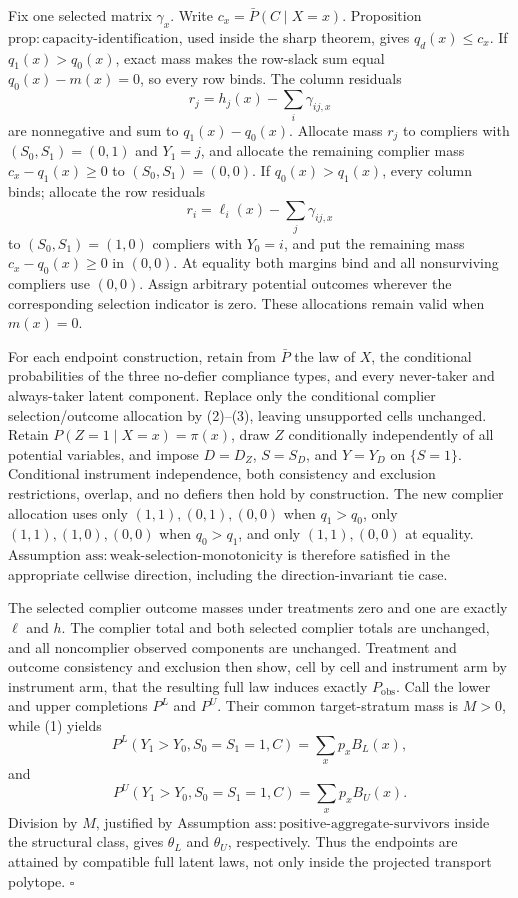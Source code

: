 Fix one selected matrix \(\gamma_x\).  Write
\(c_x=\bar P(C\mid X=x)\).  Proposition
\(\mathrm{prop{:}capacity\text{-}identification}\), used inside the sharp
theorem, gives \(q_d(x)\le c_x\).  If \(q_1(x)>q_0(x)\), exact mass makes
the row-slack sum equal \(q_0(x)-m(x)=0\), so every row binds.  The column
residuals
\[
r_j=h_j(x)-\sum_i\gamma_{ij,x}
\tag{2}
\]
are nonnegative and sum to \(q_1(x)-q_0(x)\).  Allocate mass \(r_j\) to
compliers with \((S_0,S_1)=(0,1)\) and \(Y_1=j\), and allocate the
remaining complier mass \(c_x-q_1(x)\ge0\) to \((S_0,S_1)=(0,0)\).  If
\(q_0(x)>q_1(x)\), every column binds; allocate the row residuals
\[
r_i=\ell_i(x)-\sum_j\gamma_{ij,x}
\tag{3}
\]
to \((S_0,S_1)=(1,0)\) compliers with \(Y_0=i\), and put the remaining
mass \(c_x-q_0(x)\ge0\) in \((0,0)\).  At equality both margins bind and
all nonsurviving compliers use \((0,0)\).  Assign arbitrary potential
outcomes wherever the corresponding selection indicator is zero.  These
allocations remain valid when \(m(x)=0\).

For each endpoint construction, retain from \(\bar P\) the law of \(X\),
the conditional probabilities of the three no-defier compliance types,
and every never-taker and always-taker latent component.  Replace only the
conditional complier selection/outcome allocation by (2)--(3), leaving
unsupported cells unchanged.  Retain
\(P(Z=1\mid X=x)=\pi(x)\), draw \(Z\) conditionally independently of all
potential variables, and impose \(D=D_Z\), \(S=S_D\), and \(Y=Y_D\) on
\(\{S=1\}\).  Conditional instrument independence, both consistency and
exclusion restrictions, overlap, and no defiers then hold by construction.
The new complier allocation uses only \((1,1),(0,1),(0,0)\) when
\(q_1>q_0\), only \((1,1),(1,0),(0,0)\) when \(q_0>q_1\), and only
\((1,1),(0,0)\) at equality.  Assumption
\(\mathrm{ass{:}weak\text{-}selection\text{-}monotonicity}\) is therefore
satisfied in the appropriate cellwise direction, including the
direction-invariant tie case.

The selected complier outcome masses under treatments zero and one are
exactly \(\ell\) and \(h\).  The complier total and both selected
complier totals are unchanged, and all noncomplier observed components
are unchanged.  Treatment and outcome consistency and exclusion then
show, cell by cell and instrument arm by instrument arm, that the
resulting full law induces exactly \(P_{\mathrm{obs}}\).  Call the lower
and upper completions \(P^L\) and \(P^U\).  Their common target-stratum
mass is \(M>0\), while (1) yields
\[
P^L(Y_1>Y_0,S_0=S_1=1,C)=\sum_xp_xB_L(x),
\]
and
\[
P^U(Y_1>Y_0,S_0=S_1=1,C)=\sum_xp_xB_U(x).
\]
Division by \(M\), justified by Assumption
\(\mathrm{ass{:}positive\text{-}aggregate\text{-}survivors}\) inside the
structural class, gives \(\theta_L\) and \(\theta_U\), respectively.
Thus the endpoints are attained by compatible full latent laws, not only
inside the projected transport polytope. \(\square\)